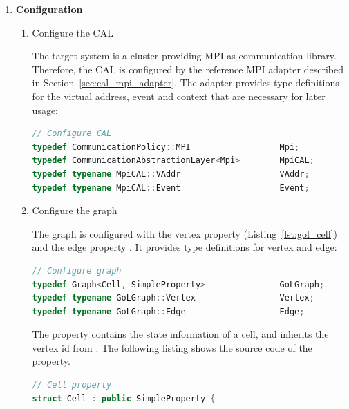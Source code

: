 \begin{enumerate}

\item \textbf{Configuration}
\begin{enumerate}

\item Configure the CAL
  
  The target system is a cluster providing MPI as communication
  library. Therefore, the CAL is configured by the reference MPI adapter
  described in Section~\ref{sec:cal_mpi_adapter}. The adapter provides
  type definitions for the virtual address, event and context that are
  necessary for later usage:

  \begin{minipage}[t]{\textwidth} 
  \begin{lstlisting}[language=C++, label=lst:conf_cal, caption={\ }]
// Configure CAL
typedef CommunicationPolicy::MPI                  Mpi;
typedef CommunicationAbstractionLayer<Mpi>        MpiCAL;
typedef typename MpiCAL::VAddr                    VAddr;
typedef typename MpiCAL::Event                    Event;
  \end{lstlisting}
  \end{minipage}

\item Configure the graph

  The graph is configured with the vertex property  
  (Listing~\ref{lst:gol_cell}) and the edge property . It
  provides type definitions for vertex and  edge:

  \begin{minipage}[t]{\textwidth} 
  \begin{lstlisting}[language=C++, label=lst:conf_graph, caption={\ }]
// Configure graph
typedef Graph<Cell, SimpleProperty>               GoLGraph;
typedef typename GoLGraph::Vertex                 Vertex;
typedef typename GoLGraph::Edge                   Edge;
  \end{lstlisting}
  \end{minipage}

  The  property contains the state information of a cell,
  and inherits the vertex id from .  The following
  listing shows the source code of the  property.

  \begin{minipage}[t]{\textwidth} 
  \begin{lstlisting}[language=C++, label=lst:gol_cell, caption={\ }]
// Cell property    
struct Cell : public SimpleProperty { 


\end{lstlisting}
\end{minipage}
\end{enumerate}
\end{enumerate}
